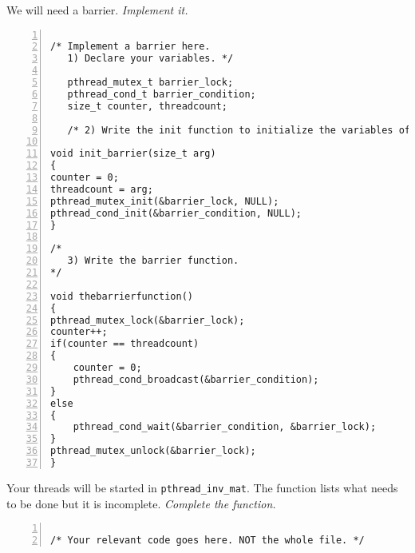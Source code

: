 \documentclass{article}
\begin{document}

\begin{ExerciseList}
\Exercise We will need a barrier.
\Question \emph{Implement it.}
\end{ExerciseList}

\begin{lstlisting}[basicstyle=\small\sffamily,
keywords={break,case,const,continue,default,else,enum,
for,if,return,switch,while,do,long,void,int,float,double,
char,struct,typedef,include,size\_t},
keywordstyle={\color{blue}},
comment={[l]{//}}, morecomment={[s]{/*}{*/}}, commentstyle=\itshape,
columns={[l]flexible}, numbers=left, numberstyle=\tiny,
frameround=fftt, frame=shadowbox, captionpos=b,
caption={Your barrier implementation.},
label=LST:barrier]

/* Implement a barrier here.
   1) Declare your variables. */
   
   pthread_mutex_t barrier_lock;
   pthread_cond_t barrier_condition;
   size_t counter, threadcount;
   
   /* 2) Write the init function to initialize the variables of your barrier. */
   
void init_barrier(size_t arg)
{
counter = 0;
threadcount = arg;
pthread_mutex_init(&barrier_lock, NULL);
pthread_cond_init(&barrier_condition, NULL);
}

/*
   3) Write the barrier function.
*/

void thebarrierfunction()
{
pthread_mutex_lock(&barrier_lock);
counter++;
if(counter == threadcount)
{
	counter = 0;
	pthread_cond_broadcast(&barrier_condition);
}
else
{
	pthread_cond_wait(&barrier_condition, &barrier_lock);
}
pthread_mutex_unlock(&barrier_lock);
}
\end{lstlisting}

\begin{ExerciseList}
  \Exercise Your threads will be started in
  \texttt{pthread\_inv\_mat}. The function lists what needs to be done
  but it is incomplete.
  \Question \emph{Complete the function.}
\end{ExerciseList}

\begin{lstlisting}[basicstyle=\small\sffamily,
keywords={break,case,const,continue,default,else,enum,
for,if,return,switch,while,do,long,void,int,float,double,
char,struct,typedef,include,size\_t},
keywordstyle={\color{blue}},
comment={[l]{//}}, morecomment={[s]{/*}{*/}}, commentstyle=\itshape,
columns={[l]flexible}, numbers=left, numberstyle=\tiny,
frameround=fftt, frame=shadowbox, captionpos=b,
caption={Function \texttt{pthread\_inv\_mat}.},
label=LST:pinvmat]

/* Your relevant code goes here. NOT the whole file. */
\end{lstlisting}
\end{document}

